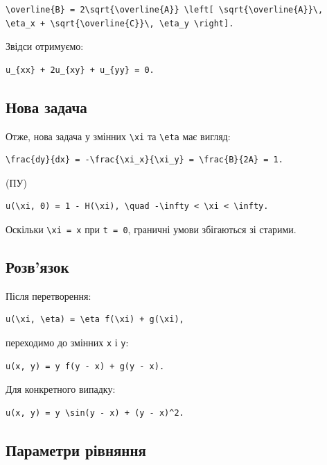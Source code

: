 \documentclass[
  ukrainian,
]{article}
\begin{document}
\begin{verbatim}
\overline{B} = 2\sqrt{\overline{A}} \left[ \sqrt{\overline{A}}\, \eta_x + \sqrt{\overline{C}}\, \eta_y \right].
\end{verbatim}

Звідси отримуємо:

\begin{verbatim}
u_{xx} + 2u_{xy} + u_{yy} = 0.
\end{verbatim}

\subsection{Нова
задача}\label{ux43dux43eux432ux430-ux437ux430ux434ux430ux447ux430}

Отже, нова задача у змінних \texttt{\textbackslash{}xi} та
\texttt{\textbackslash{}eta} має вигляд:

\begin{verbatim}
\frac{dy}{dx} = -\frac{\xi_x}{\xi_y} = \frac{B}{2A} = 1.
\end{verbatim}

(ПУ)

\begin{verbatim}
u(\xi, 0) = 1 - H(\xi), \quad -\infty < \xi < \infty.
\end{verbatim}

Оскільки \texttt{\textbackslash{}xi\ =\ x} при \texttt{t\ =\ 0},
граничні умови збігаються зі старими.

\subsection{Розв'язок}\label{ux440ux43eux437ux432ux44fux437ux43eux43a}

Після перетворення:

\begin{verbatim}
u(\xi, \eta) = \eta f(\xi) + g(\xi),
\end{verbatim}

переходимо до змінних \texttt{x} і \texttt{y}:

\begin{verbatim}
u(x, y) = y f(y - x) + g(y - x).
\end{verbatim}

Для конкретного випадку:

\begin{verbatim}
u(x, y) = y \sin(y - x) + (y - x)^2.
\end{verbatim}

\subsection{Параметри
рівняння}\label{ux43fux430ux440ux430ux43cux435ux442ux440ux438-ux440ux456ux432ux43dux44fux43dux43dux44f}
\end{document}
